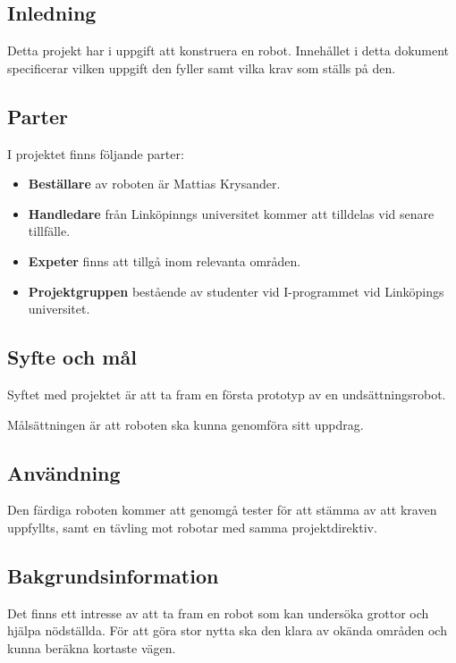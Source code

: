 \documentclass[11pt]{article}
\begin{document}
\pagebreak
{}

\begin{flushleft}

\section{Inledning}

Detta projekt har i uppgift att konstruera en robot. Innehållet i detta dokument specificerar vilken uppgift den fyller samt vilka krav som ställs på den.

\subsection{Parter}
I projektet finns följande parter:

\begin{itemize}
  \item \textbf{Beställare} av roboten är Mattias Krysander.
  \item \textbf{Handledare} från Linköpinngs universitet kommer att tilldelas vid senare tillfälle.
  \item \textbf{Expeter} finns att tillgå inom relevanta områden.
  \item \textbf{Projektgruppen} bestående av studenter vid I-programmet vid Linköpings universitet.
\end{itemize}

\subsection{Syfte och mål}
Syftet med projektet är att ta fram en första prototyp av en undsättningsrobot. 

Målsättningen är att roboten ska kunna genomföra sitt uppdrag.

\subsection{Användning}
Den färdiga roboten kommer att genomgå tester för att stämma av att kraven uppfyllts, samt en tävling mot robotar med samma projektdirektiv.

\subsection{Bakgrundsinformation}

Det finns ett intresse av att ta fram en robot som kan undersöka grottor och hjälpa nödställda. För att göra stor nytta ska den klara av okända områden och kunna beräkna kortaste vägen. 


\end{flushleft}
\end{document}
